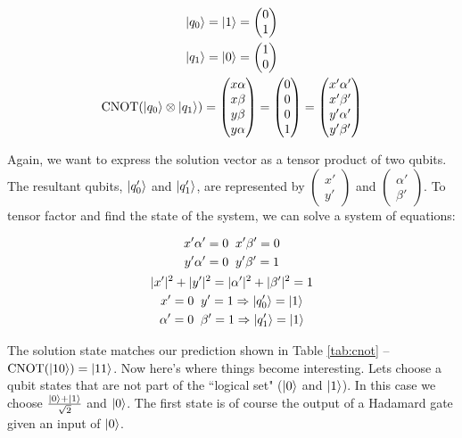\documentclass[conference]{IEEEtran}
\begin{document}
\begin{gather*}
\ket{q_0} = \ket{1} = \begin{pmatrix}0\\1\end{pmatrix}\\
\ket{q_1} = \ket{0} = \begin{pmatrix}1\\0\end{pmatrix}\\
\text{CNOT}(\ket{q_0} \otimes \ket{q_1}) =
\begin{pmatrix}x\alpha\\x\beta\\y\beta\\y\alpha\end{pmatrix} =
\begin{pmatrix}0\\0\\0\\1\end{pmatrix} = \begin{pmatrix}x'\alpha'\\x'\beta'\\y'\alpha'\\y'\beta'\end{pmatrix}
\end{gather*}

Again, we want to express the solution vector as a tensor product of two qubits. The resultant qubits, $\ket{q_0'}$ and $\ket{q_1'}$, are represented by $\begin{pmatrix}x'\\y'\end{pmatrix}$ and $\begin{pmatrix}\alpha'\\\beta'\end{pmatrix}$. To tensor factor and find the state of the system, we can solve a system of equations:

\begin{gather*}
x'\alpha' = 0 \;\; x'\beta' = 0\\
y'\alpha' = 0 \;\; y'\beta' = 1\\
|x'|^2 + |y'|^2 = |\alpha'|^2 + |\beta'|^2 = 1\\
x' = 0 \; \; y' = 1 \Rightarrow \ket{q_0'} = \ket{1} \\
\alpha' = 0 \; \; \beta' = 1 \Rightarrow \ket{q_1'} = \ket{1}
\end{gather*}

The solution state matches our prediction shown in Table \ref{tab:cnot} -- $\text{CNOT}(\ket{10}) = \ket{11}$. Now here's where things become interesting. Lets choose a qubit states that are not part of the ``logical set" ($\ket{0}$ and $\ket{1}$). In this case we choose $\frac{\ket{0} + \ket{1}}{\sqrt{2}}$ and $\ket{0}$. The first state is of course the output of a Hadamard gate given an input of $\ket{0}$.
\end{document}
